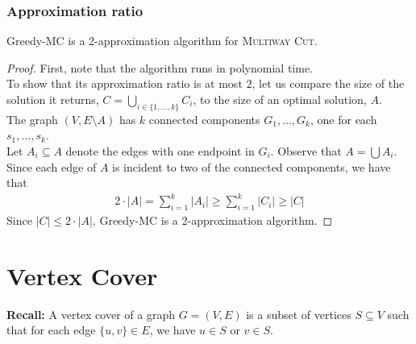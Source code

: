 \begin{frame}
	\frametitle{Approximation ratio}
	
	\begin{theorem}
		Greedy-MC is a 2-approximation algorithm for \textsc{Multiway Cut}.
	\end{theorem}
	\begin{proof}
	 First, note that the algorithm runs in polynomial time.\\
	 To show that its approximation ratio is at most $2$, let us compare the size of the solution it returns, $C = \bigcup_{i\in \{1,\dots,k\}} C_i$, to the size of an optimal solution, $A$.\\
	 The graph $(V,E\setminus A)$ has $k$ connected components $G_1, \dots, G_k$, one for each $s_1, \dots, s_k$.\\
	 Let $A_i\subseteq A$ denote the edges with one endpoint in $G_i$. Observe that $A = \bigcup A_i$.\\
	 Since each edge of $A$ is incident to two of the connected components, we have that
	 \begin{align*}
	 	 2\cdot |A| = \sum_{i=1}^k |A_i| \ge \sum_{i=1}^k |C_i| \ge |C|
	 \end{align*}
	 Since $|C|\le 2\cdot |A|$, Greedy-MC is a 2-approximation algorithm.
	\end{proof}
\end{frame}

\section{Vertex Cover}

\begin{frame}

  \noindent
  \textbf{Recall:}
  A \alert{vertex cover} of a graph $G=(V,E)$ is a subset of vertices $S\subseteq V$ such that %
  for each edge $\{u,v\}\in E$, we have $u\in S$ or $v\in S$.
  
 
 \begin{center}
 \end{center}

\end{frame}

